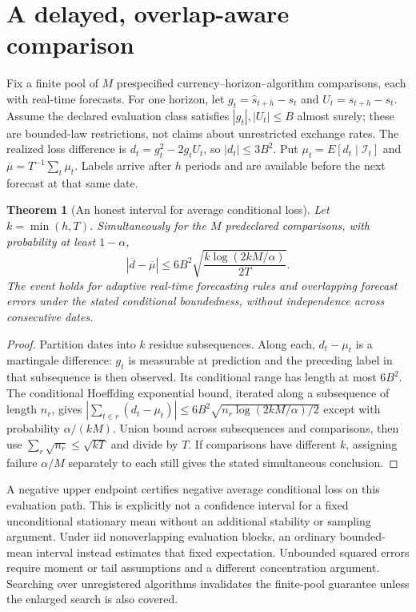 \documentclass[11pt]{article}
\newtheorem{theorem}{Theorem}
\theoremstyle{remark}
\begin{document}
\section*{A delayed, overlap-aware comparison}
Fix a finite pool of $M$ prespecified currency--horizon--algorithm comparisons, each with real-time forecasts. For one horizon, let $g_t=\widehat s_{t+h}-s_t$ and $U_t=s_{t+h}-s_t$. Assume the declared evaluation class satisfies $|g_t|,|U_t|\le B$ almost surely; these are bounded-law restrictions, not claims about unrestricted exchange rates. The realized loss difference is
$d_t=g_t^2-2g_tU_t$, so $|d_t|\le3B^2$. Put $\mu_t=E[d_t\mid\mathcal I_t]$ and $\overline\mu=T^{-1}\sum_t\mu_t$. Labels arrive after $h$ periods and are available before the next forecast at that same date.

\begin{theorem}[An honest interval for average conditional loss]
Let $k=\min(h,T)$. Simultaneously for the $M$ predeclared comparisons, with probability at least $1-\alpha$,
\[
 |\overline d-\overline\mu|
 \le6B^2\sqrt{\frac{k\log(2kM/\alpha)}{2T}}.
\]
The event holds for adaptive real-time forecasting rules and overlapping forecast errors under the stated conditional boundedness, without independence across consecutive dates.
\end{theorem}
\begin{proof}
Partition dates into $k$ residue subsequences. Along each, $d_t-\mu_t$ is a martingale difference: $g_t$ is measurable at prediction and the preceding label in that subsequence is then observed. Its conditional range has length at most $6B^2$. The conditional Hoeffding exponential bound, iterated along a subsequence of length $n_r$, gives
$|\sum_{t\in r}(d_t-\mu_t)|\le6B^2\sqrt{n_r\log(2kM/\alpha)/2}$
except with probability $\alpha/(kM)$. Union bound across subsequences and comparisons, then use $\sum_r\sqrt{n_r}\le\sqrt{kT}$ and divide by $T$. If comparisons have different $k$, assigning failure $\alpha/M$ separately to each still gives the stated simultaneous conclusion.
\end{proof}
A negative upper endpoint certifies negative average conditional loss on this evaluation path. This is explicitly not a confidence interval for a fixed unconditional stationary mean without an additional stability or sampling argument. Under iid nonoverlapping evaluation blocks, an ordinary bounded-mean interval instead estimates that fixed expectation. Unbounded squared errors require moment or tail assumptions and a different concentration argument. Searching over unregistered algorithms invalidates the finite-pool guarantee unless the enlarged search is also covered.
\end{document}
